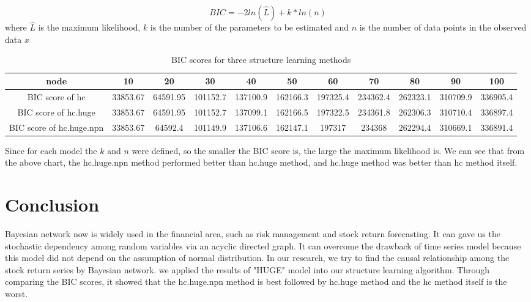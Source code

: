 \documentclass[12pt]{article}
\theoremstyle{plain}
\begin{document}
 \begin{equation}
BIC=-2ln(\hat{L})+ k*ln(n)
\end{equation}
where $\hat{L}$ is the maximum likelihood, $k$ is the number of the parameters to be estimated and $n$ is the number of data points in the observed data $x$


\begin{table}[h!]\tiny

  \caption{BIC scores for three structure learning methods}
\begin{center}
    \begin{tabular}{| c | c | c | c | c |c |c |c |c |c |c |}
    \hline
    node& 10 & 20 & 30& 40& 50& 60& 70& 80& 90& 100\\
    \hline
BIC score of hc &33853.67&64591.95&101152.7&137100.9&162166.3&197325.4&234362.4&262323.1&310709.9&336905.4\\
BIC score of hc.huge&33853.67&64591.95&101152.7&137099.1&162166.5&197322.5&234361.8&262306.3&310710.4&336897.4\\
BIC score of hc.huge.npn&33853.67&64592.4&101149.9&137106.6&162147.1&197317&234368&262294.4&310669.1&336891.4\\
\hline
\end{tabular}
  \end{center}
\end{table}
 
Since for each model the $k$ and $n$ were defined, so the smaller the BIC score is, the large the maximum likelihood is. We can see that from the above chart, the hc.huge.npn method performed better than hc.huge method, and hc.huge method was better than hc method itself.\\
\section{Conclusion}
Bayesian network now is widely used in the financial area, such as risk management and stock return forecasting. It can gave us the stochastic dependency among random variables via an acyclic directed graph. It can overcome the drawback of time series model because this model did not depend on the assumption of normal distribution. In our research, we try to find the causal relationship among the stock return series by Bayesian network. we applied the results of "HUGE" model into our structure learning algorithm. Through comparing the BIC scores, it showed that the hc.huge.npn method is best followed by hc.huge method and the hc method itself is the worst.
\end{document}
